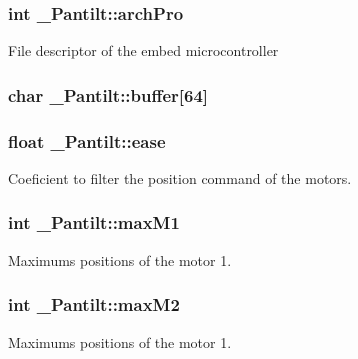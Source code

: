 \subsubsection[{\texorpdfstring{arch\+Pro}{archPro}}]{\setlength{\rightskip}{0pt plus 5cm}int \+\_\+\+Pantilt\+::arch\+Pro}\hypertarget{struct___pantilt_ad01a4e572846f68131a375e708a825aa}{}\label{struct___pantilt_ad01a4e572846f68131a375e708a825aa}
File descriptor of the embed microcontroller 
\subsubsection[{\texorpdfstring{buffer}{buffer}}]{\setlength{\rightskip}{0pt plus 5cm}char \+\_\+\+Pantilt\+::buffer\mbox{[}64\mbox{]}}\hypertarget{struct___pantilt_aa3d78142802cbd9374bc905f81539a37}{}\label{struct___pantilt_aa3d78142802cbd9374bc905f81539a37}
\subsubsection[{\texorpdfstring{ease}{ease}}]{\setlength{\rightskip}{0pt plus 5cm}float \+\_\+\+Pantilt\+::ease}\hypertarget{struct___pantilt_a8cdf704a9fb3b595305ec85fa3b6c0e6}{}\label{struct___pantilt_a8cdf704a9fb3b595305ec85fa3b6c0e6}
Coeficient to filter the position command of the motors. 
\subsubsection[{\texorpdfstring{max\+M1}{maxM1}}]{\setlength{\rightskip}{0pt plus 5cm}int \+\_\+\+Pantilt\+::max\+M1}\hypertarget{struct___pantilt_a7a297f4584b4716b650e36bd7b52b933}{}\label{struct___pantilt_a7a297f4584b4716b650e36bd7b52b933}
Maximums positions of the motor 1. 
\subsubsection[{\texorpdfstring{max\+M2}{maxM2}}]{\setlength{\rightskip}{0pt plus 5cm}int \+\_\+\+Pantilt\+::max\+M2}\hypertarget{struct___pantilt_a3d40173704b6bee3917c36ad86e4d506}{}\label{struct___pantilt_a3d40173704b6bee3917c36ad86e4d506}
Maximums positions of the motor 1. 
